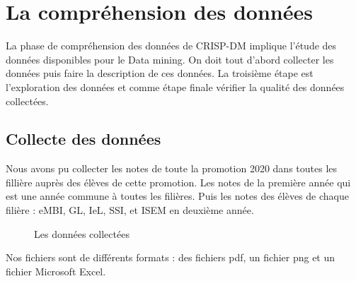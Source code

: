 \documentclass{article}
\begin{document}
        \section{La compréhension des données}
            La phase de compréhension des données de CRISP-DM implique l’étude des données disponibles pour le Data mining. On doit tout d’abord collecter les données puis faire la description de ces données. La troisième étape est l’exploration des données et comme étape finale vérifier la qualité des données collectées.\\
            \subsection{Collecte des données}
                Nous avons pu collecter les notes de toute la promotion 2020 dans toutes les fillière auprès des élèves de cette promotion. Les notes de la première année qui est une année commune à toutes les filières. Puis les notes des élèves de chaque filière : eMBI, GL, IeL, SSI, et ISEM en deuxième année.\par
                \begin{figure}[h!]
                    \centering
                    \caption{Les données collectées}
                    \label{fig:data}
                \end{figure} 
                Nos fichiers sont de différents formats : des fichiers pdf, un fichier png et un fichier Microsoft Excel.\\
\end{document}
